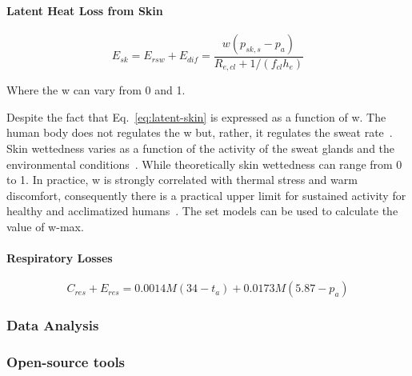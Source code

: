 \paragraph{Latent Heat Loss from Skin}

\begin{equation}
    E_{s k}=E_{rsw}+E_{dif}=\frac{w\left(p_{s k, s}-p_{a}\right)}{R_{e, c l}+1 /\left(f_{c l} h_{e}\right)}\label{eq:latent-skin}
\end{equation}

Where the \ac{w} can vary from 0 and 1.


Despite the fact that Eq.~\ref{eq:latent-skin} is expressed as a function of \ac{w}.
The human body does not regulates the \acl{w} but, rather, it regulates the sweat rate~\cite{ASHRA2017}.
Skin wettedness varies as a function of the activity of the sweat glands and the environmental conditions~\cite{ASHRA2017}.
While theoretically skin wettedness can range from 0 to 1.
In practice, \ac{w} is strongly correlated with thermal stress and warm discomfort, consequently there is a practical upper limit for sustained activity for healthy and acclimatized humans~\cite{ASHRA2017}.
The \ac{set} models can be used to calculate the value of \ac{w-max}.


\paragraph{Respiratory Losses}

\begin{equation}
    C_{res} + E_{res} = 0.0014M(34-t_{a}) + 0.0173M(5.87-p_{a})\label{eq:respiratory-losses}
\end{equation}

\subsubsection{Data Analysis}


\subsubsection{Open-source tools}

